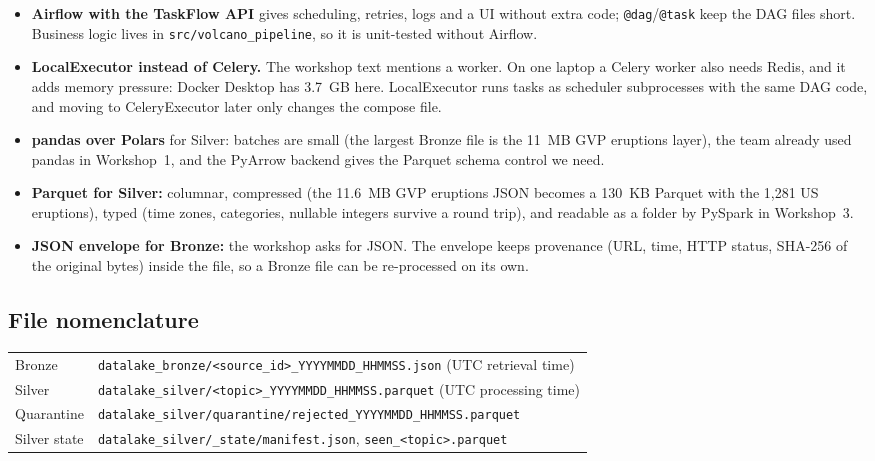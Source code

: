 \documentclass[11pt,a4paper]{article}
\begin{document}
\begin{itemize}
  \item \textbf{Airflow with the TaskFlow API} gives scheduling, retries, logs and a UI without extra code; \texttt{@dag}/\texttt{@task} keep the DAG files short. Business logic lives in \texttt{src/volcano\_pipeline}, so it is unit-tested without Airflow.
  \item \textbf{LocalExecutor instead of Celery.} The workshop text mentions a worker. On one laptop a Celery worker also needs Redis, and it adds memory pressure: Docker Desktop has 3.7~GB here. LocalExecutor runs tasks as scheduler subprocesses with the same DAG code, and moving to CeleryExecutor later only changes the compose file.
  \item \textbf{pandas over Polars} for Silver: batches are small (the largest Bronze file is the 11~MB GVP eruptions layer), the team already used pandas in Workshop~1, and the PyArrow backend gives the Parquet schema control we need.
  \item \textbf{Parquet for Silver:} columnar, compressed (the 11.6~MB GVP eruptions JSON becomes a 130~KB Parquet with the 1,281 US eruptions), typed (time zones, categories, nullable integers survive a round trip), and readable as a folder by PySpark in Workshop~3.
  \item \textbf{JSON envelope for Bronze:} the workshop asks for JSON. The envelope keeps provenance (URL, time, HTTP status, SHA-256 of the original bytes) inside the file, so a Bronze file can be re-processed on its own.
\end{itemize}

\subsection{File nomenclature}

\begin{tabular}{ll}
\toprule
Bronze & \texttt{datalake\_bronze/<source\_id>\_YYYYMMDD\_HHMMSS.json} (UTC retrieval time)\\
Silver & \texttt{datalake\_silver/<topic>\_YYYYMMDD\_HHMMSS.parquet} (UTC processing time)\\
Quarantine & \texttt{datalake\_silver/quarantine/rejected\_YYYYMMDD\_HHMMSS.parquet}\\
Silver state & \texttt{datalake\_silver/\_state/manifest.json}, \texttt{seen\_<topic>.parquet}\\
\bottomrule
\end{tabular}
\end{document}
